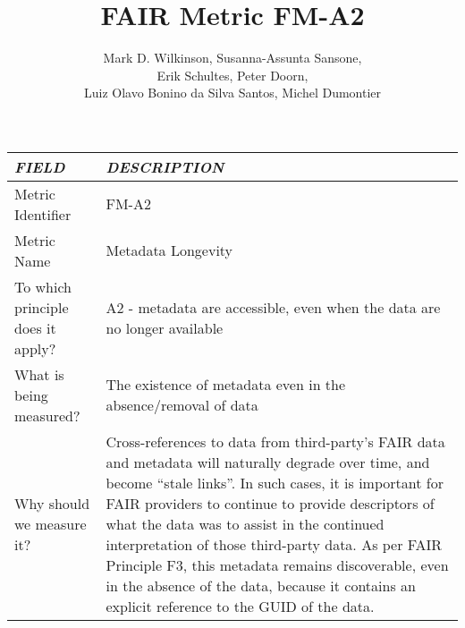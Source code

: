 \documentclass[english]{article}
\begin{document}
\title{FAIR Metric FM-A2}

\author{Mark D. Wilkinson, Susanna-Assunta Sansone, \\Erik Schultes, Peter Doorn,\\ 
Luiz Olavo Bonino da Silva Santos, Michel Dumontier}

\maketitle

\newpage





\begin{longtable}{|p{5cm}|p{9cm}|}


\hline
\emph{FIELD} & \emph{DESCRIPTION} \\
\hline
Metric Identifier &   FM-A2
\\


\hline
Metric Name &   


Metadata Longevity


 \\



\hline
To which principle does it apply? &   


A2 - metadata are accessible, even when the data are no longer available

\\



\hline
What is being measured? & 


The existence of metadata even in the absence/removal of data


\\



\hline
Why should we measure it? & 



Cross-references to data from third-party’s FAIR data and metadata will naturally degrade over time, and become “stale links”.  In such cases, it is important for FAIR providers to continue to provide descriptors of what the data was to assist in the continued interpretation of those third-party data.  As per FAIR Principle F3, this metadata remains discoverable, even in the absence of the data, because it contains an explicit reference to the GUID of the data.
  
\\




\end{longtable}
\end{document}
